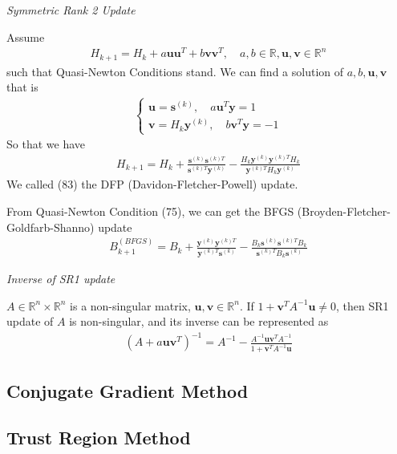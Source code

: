 \documentclass[runningheads]{llncs}
\begin{document}
\vspace{.3em}
\par
\noindent\textit{Symmetric Rank 2 Update}
\par
Assume
\begin{align}
    H_{k+1} = H_k + a \mathbf{u}\mathbf{u}^T +
     b \mathbf{v}\mathbf{v}^T,
     \quad a, b \in \mathbb{R}, \mathbf{u}, \mathbf{v} \in \mathbb{R}^n
\end{align}
such that Quasi-Newton Conditions stand.
We can find a solution of $a, b, \mathbf{u}, \mathbf{v}$ that is
\begin{align}
    \left\{
    \begin{array}{ll}
        \mathbf{u} = \mathbf{s}^{(k)}, 
        \quad a \mathbf{u}^T \mathbf{y} = 1 \\
        \mathbf{v} = H_k \mathbf{y}^{(k)}, 
        \quad b \mathbf{v}^T \mathbf{y} = -1
    \end{array}
    \right.
\end{align}
So that we have
\begin{align}
    H_{k+1} = H_k + \frac{\mathbf{s}^{(k)}\mathbf{s}^{(k)T}}
    {\mathbf{s}^{(k)T} \mathbf{y}^{(k)}} - 
    \frac{H_k\mathbf{y}^{(k)} \mathbf{y}^{(k)T} H_k}
    {\mathbf{y}^{(k)T}H_k\mathbf{y}^{(k)}}
\end{align}
We called (83) the DFP (Davidon-Fletcher-Powell) update.
\par
From Quasi-Newton Condition (75), we can get the
BFGS (Broyden-Fletcher-Goldfarb-Shanno) update
\begin{align}
    B_{k+1}^{(BFGS)} = B_k +
    \frac{\mathbf{y}^{(k)}\mathbf{y}^{(k)T}}
    {\mathbf{y}^{(k)T} \mathbf{s}^{(k)}}
    - \frac{B_k \mathbf{s}^{(k)}\mathbf{s}^{(k)T} B_k}
    {\mathbf{s}^{(k)T} B_k \mathbf{s}^{(k)}}
\end{align}
\vspace{.3em}
\par\noindent\textit{Inverse of SR1 update}
\begin{theorem}
    $A \in \mathbb{R}^n \times \mathbb{R}^n$ is a 
    non-singular matrix, $\mathbf{u}, \mathbf{v} \in \mathbb{R}^n$.
    If $1 + \mathbf{v}^TA^{-1}\mathbf{u} \neq 0$,
    then SR1 update of $A$ is non-singular, and its inverse
    can be represented as
    \begin{align}
        (A + a\mathbf{u}\mathbf{v}^T)^{-1} = 
        A^{-1} - \frac{A^{-1}\mathbf{u}\mathbf{v}^TA^{-1}}
        {1 + \mathbf{v}^TA^{-1}\mathbf{u}}
    \end{align}
\end{theorem}

\subsection{Conjugate Gradient Method}
\subsection{Trust Region Method}
\end{document}
